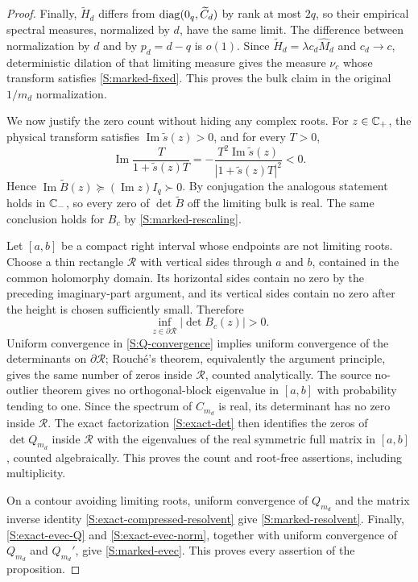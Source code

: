 \begin{proof}
Finally, $\widetilde H_d$ differs from
$\operatorname{diag}(0_q,\widetilde C_d)$ by rank at most $2q$, so their empirical
spectral measures, normalized by $d$, have the same limit.  The difference
between normalization by $d$ and by $p_d=d-q$ is $o(1)$.  Since
$\widetilde H_d=\lambda c_d\widehat M_d$ and $c_d\to c$, deterministic
dilation of that limiting measure gives the measure $\nu_c$ whose transform
satisfies \eqref{S:marked-fixed}.  This proves the bulk claim in the original
$1/m_d$ normalization.

We now justify the zero count without hiding any complex roots.  For
$z\in\mathbb{C}_+$, the physical transform satisfies
$\operatorname{Im}\widetilde s(z)>0$, and for every $T>0$,
\begin{equation}
\operatorname{Im}\frac{T}{1+\widetilde s(z)T}
=
-\frac{T^2\operatorname{Im}\widetilde s(z)}
{|1+\widetilde s(z)T|^2}<0.
\end{equation}
Hence $\operatorname{Im}\widetilde B(z)\succeq
(\operatorname{Im}z)I_q\succ0$.  By conjugation the analogous statement
holds in $\mathbb{C}_-$, so every zero of $\det\widetilde B$ off the limiting bulk
is real.  The same conclusion holds for $B_c$ by
\eqref{S:marked-rescaling}.

Let $[a,b]$ be a compact right interval whose endpoints are not limiting
roots.  Choose a thin rectangle $\mathcal R$ with vertical sides through
$a$ and $b$, contained in the common holomorphy domain.  Its horizontal
sides contain no zero by the preceding imaginary-part argument, and its
vertical sides contain no zero after the height is chosen sufficiently
small.  Therefore
\begin{equation}
\inf_{z\in\partial\mathcal R}|\det B_c(z)|>0.
\end{equation}
Uniform convergence in \eqref{S:Q-convergence} implies uniform convergence
of the determinants on $\partial\mathcal R$; Rouch\'e's theorem, equivalently
the argument principle, gives the same number of zeros inside
$\mathcal R$, counted analytically.  The source no-outlier theorem gives no
orthogonal-block eigenvalue in $[a,b]$ with probability tending to one.
Since the spectrum of $C_{m_d}$ is real, its determinant has no zero inside
$\mathcal R$.  The exact factorization \eqref{S:exact-det} then identifies
the zeros of $\det Q_{m_d}$ inside $\mathcal R$ with the eigenvalues of the
real symmetric full matrix in $[a,b]$, counted algebraically.  This proves
the count and root-free assertions, including multiplicity.

On a contour avoiding limiting roots, uniform convergence of $Q_{m_d}$ and
the matrix inverse identity \eqref{S:exact-compressed-resolvent} give
\eqref{S:marked-resolvent}.  Finally,
\eqref{S:exact-evec-Q} and \eqref{S:exact-evec-norm}, together with uniform
convergence of $Q_{m_d}$ and $Q_{m_d}'$, give
\eqref{S:marked-evec}.  This proves every assertion of the proposition.
\end{proof}

